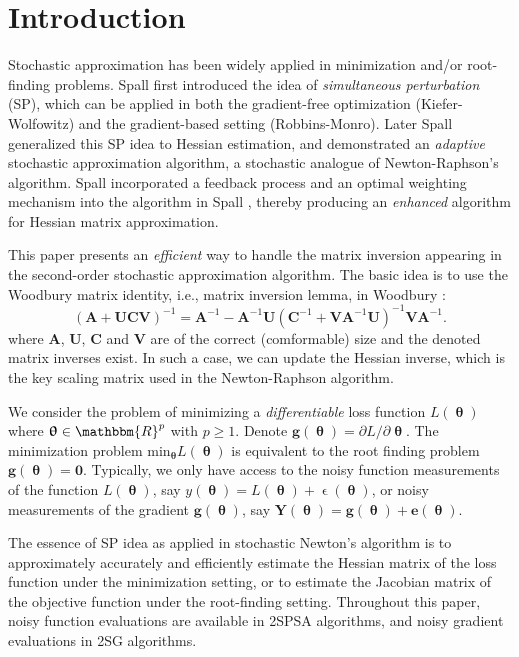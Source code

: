 \documentclass[conference]{IEEEtran} \ifCLASSINFOpdf
\begin{document}
\section{Introduction} \label{Introduction} Stochastic
approximation has been widely applied in minimization and/or
root-finding problems. Spall \cite{Spall1992} first introduced the
idea of \textit{simultaneous perturbation} (SP), which can be applied
in both the gradient-free optimization (Kiefer-Wolfowitz) and the
gradient-based setting (Robbins-Monro). Later Spall \cite{Spall2000}
generalized this SP idea to Hessian estimation, and demonstrated an
\textit{adaptive} stochastic approximation algorithm, a stochastic
analogue of Newton-Raphson's algorithm. Spall \cite{Spall2009}
incorporated a feedback process and an optimal weighting mechanism
into the algorithm in Spall \cite{Spall2000}, thereby producing an
\textit{enhanced} algorithm for Hessian matrix approximation.

This paper presents an \textit{efficient} way to handle the
matrix inversion appearing in the second-order stochastic
approximation algorithm. The basic idea is to use the Woodbury matrix
identity, i.e., matrix inversion lemma, in Woodbury
\cite{Woodbury1950}:
\begin{equation} \label{eq:MatrixInversion}
  (\bm{A}+\bm{UCV})^{-1}=\bm{A}^{-1}-\bm{A}^{-1}\bm{U}(\bm{C}^{-1}+\bm{V}\bm{A}^{-1}\bm{U})^{-1}\bm{V}\bm{A}^{-1}.
\end{equation}
where $\bm{A}$, $\bm{U}$, $\bm{C}$ and $\bm{V}$
are of the correct (comformable) size and the denoted matrix inverses
exist. In such a case, we can update the Hessian inverse, which is the
key scaling matrix used in the Newton-Raphson algorithm.

We consider the problem of minimizing a
\textit{differentiable} loss function $ L(\bm{\uptheta}) $ where
$ \bm{\uptheta} \in \mathbbm{R}^p $ with $ p\ge1 $. Denote
$\bm{g}(\bm{\uptheta})={\partial L}/{\partial \bm{\uptheta}}$. The
minimization problem ${\text{min}}_{\bm{\uptheta}}L(\bm{\uptheta})$ is
equivalent to the root finding problem $\bm{g}(\bm{\uptheta})=\bm{0}$.
Typically, we only have access to the noisy function measurements of
the function $ L(\bm{\uptheta}) $, say
$ y(\bm{\uptheta})=L(\bm{\uptheta})+\upvarepsilon(\bm{\uptheta}) $, or
noisy measurements of the gradient $\bm{g}(\bm{\uptheta})$, say
$\bm{Y}(\bm{\uptheta})=\bm{g}(\bm{\uptheta})+\bm{e}(\bm{\uptheta})$.

The essence of SP idea as applied in stochastic Newton's
algorithm is to approximately accurately and efficiently estimate the
Hessian matrix of the loss function under the minimization setting, or
to estimate the Jacobian matrix of the objective function under the
root-finding setting. Throughout this paper, noisy function
evaluations are available in 2SPSA algorithms, and noisy gradient
evaluations in 2SG algorithms.
\end{document}
